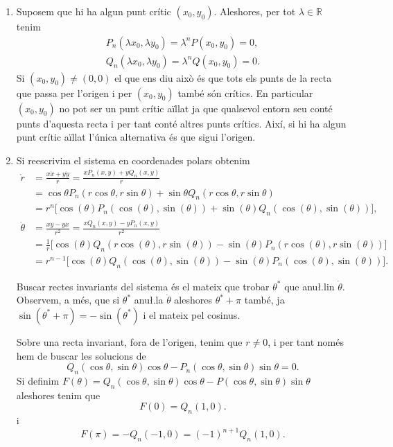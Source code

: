 \documentclass[12pt]{report}
\numberwithin{table}{section}
\numberwithin{equation}{section}
\numberwithin{figure}{section}
\newcommand{\R}{\mathbb{R}}
\begin{document}
\begin{enumerate}[label=(\roman*), font=\bfseries \sffamily, wide, labelwidth=!, labelindent=0pt]
	\item Suposem que hi ha algun punt crític \( (x_0, y_0) \). Aleshores, per tot \( \lambda \in \R \) tenim
		\begin{gather*}
			P_n(\lambda x_0, \lambda y_0) = \lambda^n P(x_0, y_0) = 0, \\
			Q_n(\lambda x_0, \lambda y_0) = \lambda^n Q(x_0, y_0) = 0. 
		\end{gather*}
		Si \( (x_0, y_0) \neq (0,0) \) el que ens diu això és que tots els punts de la recta que passa per l'origen i per \( (x_0, y_0) \) també són crítics. En particular \( (x_0, y_0) \) no pot ser un punt crític aïllat ja que qualsevol entorn seu conté punts d'aquesta recta i per tant conté altres punts crítics. Així, si hi ha algun punt crític aïllat l'única alternativa és que sigui l'origen. 	

	\item Si reescrivim el sistema en coordenades polars obtenim
		\begin{align*}
			\dot{r} & = \frac{x\dot{x} + y \dot{y}}{r} = \frac{xP_n(x,y) + yQ_n(x,y)}{r} \\
							& = \cos{\theta} P_n(r\cos{\theta}, r \sin{\theta}) + \sin{\theta} Q_n(r \cos{\theta}, r \sin{\theta}) \\
							& = r^n  \big[\cos{(\theta)} P_n(\cos{(\theta)}, \sin{(\theta)}) + \sin{(\theta)} Q_n(\cos{(\theta)}, \sin{(\theta)})\big], \\
			\dot{\theta} & = \frac{x\dot{y} - y \dot{x}}{r^2} = \frac{x Q_n(x,y) - y P_n(x,y)}{r^2} \\
									 & = \frac{1}{r} \big[ \cos{(\theta)} Q_n(r \cos{(\theta)}, r \sin{(\theta)}) - \sin{(\theta)} P_n(r \cos{(\theta)}, r \sin{(\theta)})  \big] \\
									 & = r^{n - 1} \big[ \cos{(\theta)} Q_n(\cos{(\theta)}, \sin{(\theta)}) - \sin{(\theta)} P_n(\cos{(\theta)}, \sin{(\theta)})  \big]. 
		\end{align*}

		Buscar rectes invariants del sistema és el mateix que trobar \( \theta^\ast \) que anu\l.lin \( \dot{\theta} \). Observem, a més, que si \( \theta^\ast \) anu\l.la \( \dot{\theta} \) aleshores \( \theta^\ast + \pi \) també, ja \( \sin{(\theta^\ast + \pi)} = - \sin{(\theta^\ast)} \) i el mateix pel cosinus.   

		Sobre una recta invariant, fora de l'origen, tenim que \( r \neq 0 \), i per tant només hem de buscar les solucions de 
		\begin{equation*}
			Q_n(\cos{\theta}, \sin{\theta}) \cos{\theta} - P_n(\cos{\theta}, \sin{\theta}) \sin{\theta} = 0.
		\end{equation*}
		Si definim \( F(\theta) =	Q_n(\cos{\theta}, \sin{\theta}) \cos{\theta} - P(\cos{\theta}, \sin{\theta}) \sin{\theta} \) aleshores tenim que 
		\begin{equation*}
			F(0) = Q_n(1, 0).
		\end{equation*}
		i 
		\begin{equation*}
			F(\pi) = - Q_{n}(-1, 0) = (-1)^{n+1}Q_n(1,0).
		\end{equation*}


\end{enumerate}
\end{document}
